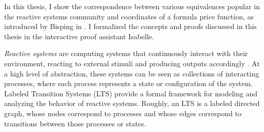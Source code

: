 %
\begin{isabellebody}%
%
%
\isadelimtheory
%
\endisadelimtheory
%
\isatagtheory
%
\endisatagtheory
{\isafoldtheory}%
%
\isadelimtheory
%
\endisadelimtheory
%
\isadelimdocument
%
\endisadelimdocument
%
\isatagdocument
%
\isamarkuptrue%
%
\endisatagdocument
{\isafolddocument}%
%
\isadelimdocument
%
\endisadelimdocument
%
\begin{isamarkuptext}%
In this thesis, I show the correspondence between various equivalences popular in the reactive
systems community and coordinates of a formula price function, as introduced by Bisping in \cite{bisping2023process}. I formalized the concepts and proofs discussed in this thesis in the interactive proof assistant Isabelle.

\textit{Reactive systems} are computing systems that continuously interact with their environment, reacting to external stimuli and producing outputs accordingly \cite{harel85}.
At a high level of abstraction, these systems can be seen as collections of interacting processes, where each process represents a state or configuration of the system. 
Labeled Transition Systems (LTS) \cite{keller76} provide a formal framework for modeling and analyzing the behavior of reactive systems. Roughly, an LTS is a labeled directed graph, whose nodes correspond to processes
and whose edges correspond to transitions between those processes or states.


\end{isamarkuptext}
\end{isabellebody}

